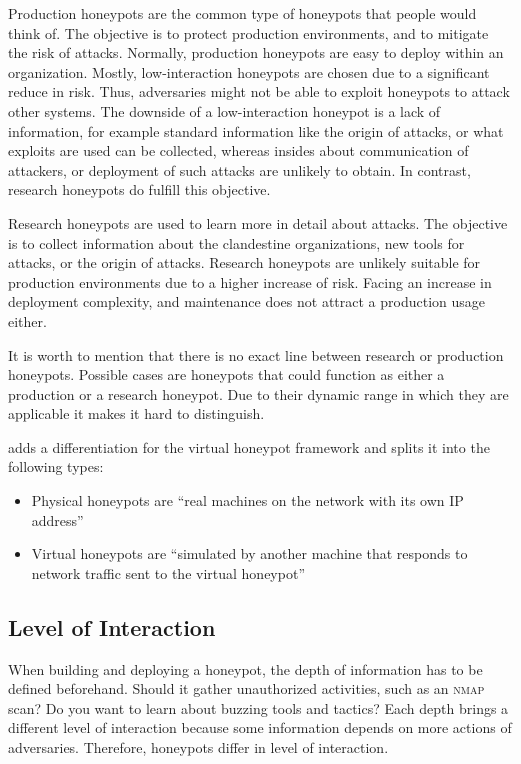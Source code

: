 Production honeypots are the common type of honeypots that people would think of.
The objective is to protect production environments, and to mitigate the risk of attacks.
Normally, production honeypots are easy to deploy within an organization.
Mostly, low-interaction honeypots are chosen due to a significant reduce in risk.
Thus, adversaries might not be able to exploit honeypots to attack other systems.
The downside of a low-interaction honeypot is a lack of information, for example standard information like the origin of attacks, or what exploits are used can be collected, whereas insides about communication of attackers, or deployment of such attacks are unlikely to obtain.
In contrast, research honeypots do fulfill this objective. \cite{Spitzner2003}

Research honeypots are used to learn more in detail about attacks.
The objective is to collect information about the clandestine organizations, new tools for attacks, or the origin of attacks.
Research honeypots are unlikely suitable for production environments due to a higher increase of risk.
Facing an increase in deployment complexity, and maintenance does not attract a production usage either. \cite{Spitzner2003}

It is worth to mention that there is no exact line between research or production honeypots.
Possible cases are honeypots that could function as either a production or a research honeypot.
Due to their dynamic range in which they are applicable it makes it hard to distinguish.

\citet{Provos2003} adds a differentiation for the virtual honeypot framework and splits it into the following types:

\begin{itemize}
    \item Physical honeypots are \enquote{real machines on the network with its own IP address} \cite{Provos2003}
    \item Virtual honeypots are \enquote{simulated by another machine that responds to network traffic sent to the virtual honeypot} \cite{Provos2003}
\end{itemize}

\subsection{Level of Interaction}
\label{subsec:interaction-honeypots}

When building and deploying a honeypot, the depth of information has to be defined beforehand.
Should it gather unauthorized activities, such as an \textsc{nmap} scan?
Do you want to learn about buzzing tools and tactics?
Each depth brings a different level of interaction because some information depends on more actions of adversaries.
Therefore, honeypots differ in level of interaction.


